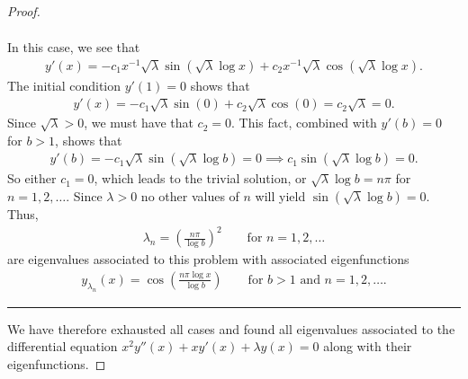 \documentclass[12pt]{article}
\theoremstyle{definition}
\newenvironment{case}{%
  \let\olditem\item%
  \renewcommand\item[1][]{\olditem \textbf{##1} \\}%
  \begin{enumerate}[label=\textbf{Case \arabic*:},itemindent=*,leftmargin=0em]}{\end{enumerate}%
}
\begin{document}
\begin{proof}
\begin{case}
\begin{align*}
      \end{align*}
      In this case, we see that
      \begin{align*}
        y'(x) = -c_1x^{-1}\sqrt{\lambda}\sin\left(\sqrt{\lambda}\log x\right) + c_2x^{-1}\sqrt{\lambda}\cos\left(\sqrt{\lambda}\log x\right).
      \end{align*}
      The initial condition $y'(1) = 0$ shows that
      \begin{align*}
        y'(x) = -c_1\sqrt{\lambda}\sin\left(0\right) + c_2\sqrt{\lambda}\cos\left(0\right) = c_2\sqrt{\lambda} = 0.
      \end{align*}
      Since $\sqrt{\lambda} > 0$, we must have that $c_2 = 0$. This fact, combined
      with $y'(b) = 0$ for $b>1$, shows that
      \begin{align*}
        y'(b) = -c_1\sqrt{\lambda}\sin\left(\sqrt{\lambda}\log b\right) = 0 \implies c_1\sin\left(\sqrt{\lambda}\log b\right) = 0.
      \end{align*}
      So either $c_1 = 0$, which leads to the trivial solution, or $\sqrt{\lambda}\log b = n\pi$ for $n=1,2,\dots$. Since $\lambda > 0$ no
      other values of $n$ will yield $\sin\left(\sqrt{\lambda}\log b\right) = 0$. Thus,
      \begin{align*}
        \lambda_n = \left(\frac{n\pi}{\log b}\right)^2 \qquad \text{for $n=1,2,\dots$}
      \end{align*}
      are eigenvalues associated to this problem with associated eigenfunctions
      \begin{align*}
        y_{\lambda_n}(x) = \cos\left(\frac{n\pi\log x}{\log b}\right) \qquad \text{for $b>1$ and $n=1,2,\dots$}.
      \end{align*}
  \end{case}
  \rule{\textwidth}{1pt}

  We have therefore exhausted all cases and found all eigenvalues associated to
  the differential equation $x^2y''(x) + xy'(x) + \lambda y(x) = 0$ along with
  their eigenfunctions.
\end{proof}
\end{document}
